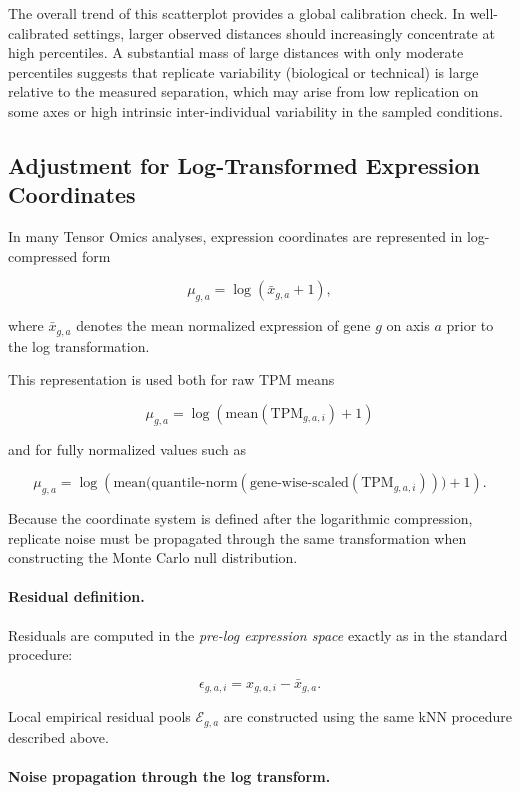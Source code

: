             The overall trend of this scatterplot provides a global calibration check. In well-calibrated settings, larger observed distances should increasingly concentrate at high percentiles. A substantial mass of large distances with only moderate percentiles suggests that replicate variability (biological or technical) is large relative to the measured separation, which may arise from low replication on some axes or high intrinsic inter-individual variability in the sampled conditions.

\subsection{Adjustment for Log-Transformed Expression Coordinates}

In many Tensor Omics analyses, expression coordinates are represented in log-compressed form

\[
\mu_{g,a} = \log(\bar{x}_{g,a} + 1),
\]

where $\bar{x}_{g,a}$ denotes the mean normalized expression of gene $g$ on axis $a$ prior to the log transformation.

This representation is used both for raw TPM means

\[
\mu_{g,a} = \log(\mathrm{mean}(\mathrm{TPM}_{g,a,i}) + 1)
\]

and for fully normalized values such as

\[
\mu_{g,a} =
\log\!\left(
\mathrm{mean}\big(
\mathrm{quantile\text{-}norm}(
\mathrm{gene\text{-}wise\text{-}scaled}(\mathrm{TPM}_{g,a,i})
)\big) + 1
\right).
\]

Because the coordinate system is defined after the logarithmic compression, replicate noise must be propagated through the same transformation when constructing the Monte Carlo null distribution.

\paragraph{Residual definition.}

Residuals are computed in the \emph{pre-log expression space} exactly as in the standard procedure:

\[
\epsilon_{g,a,i} = x_{g,a,i} - \bar{x}_{g,a}.
\]

Local empirical residual pools $\mathcal{E}_{g,a}$ are constructed using the same kNN procedure described above.

\paragraph{Noise propagation through the log transform.}

